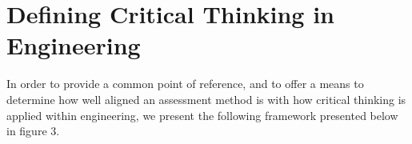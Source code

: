 \section{Defining Critical Thinking in Engineering}

In order to provide a common point of reference, and to offer a means to determine how well aligned an assessment method is with how critical thinking is applied within engineering, we present the following framework presented below in figure 3.

